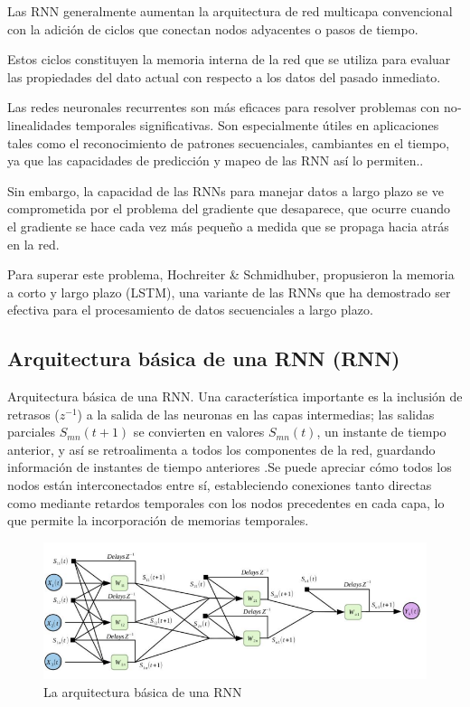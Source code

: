 Las RNN generalmente aumentan la arquitectura de red multicapa convencional con la adición de ciclos que conectan nodos adyacentes o pasos de tiempo.

Estos ciclos constituyen la memoria interna de la red que se utiliza para evaluar las propiedades del dato actual con respecto a los datos del pasado inmediato.

Las redes neuronales recurrentes son más eficaces para resolver problemas con no­linealidades temporales significativas. Son especialmente útiles en aplicaciones tales
como el reconocimiento de patrones secuenciales, cambiantes en el tiempo, ya que las capacidades de predicción y mapeo de las RNN así lo permiten\cite{montesdeoca2016estudios}..

Sin embargo, la capacidad de las RNNs para manejar datos a largo plazo se ve comprometida por el problema del gradiente que desaparece, que ocurre cuando el gradiente se hace cada vez más pequeño a medida que se propaga hacia atrás en la red\cite{tomas2023prediccion}.

Para  superar  este  problema,  Hochreiter \& Schmidhuber,  propusieron  la  memoria  a  corto  y  largo  plazo  (LSTM),  una  variante  de  las  RNNs  que  ha  demostrado  ser efectiva para el procesamiento de datos secuenciales a largo plazo\cite{tomas2023prediccion}.

\subsection{Arquitectura básica de una RNN (RNN)}
Arquitectura básica de una RNN. Una característica importante es la inclusión de retrasos ($z^{-1}$) a la salida de las neuronas en las capas intermedias; las salidas parciales $S_{mn}(t + 1)$ se convierten en valores $S_{mn}(t)$, un instante de tiempo anterior, y así se retroalimenta a todos los componentes de la red, guardando información de instantes de tiempo anteriores \cite{montesdeoca2016estudios}.Se puede apreciar cómo todos los nodos están interconectados entre sí, estableciendo conexiones tanto directas como mediante retardos temporales con los nodos precedentes en cada capa, lo que permite la incorporación de memorias temporales.

\begin{figure}[H]
  \begin{center}
    \includegraphics[scale=0.70]{./redes_recurrentes.png}
    \caption{La arquitectura básica de una RNN}
    \label{fig:red_recurreente}
  \end{center}
\end{figure}

